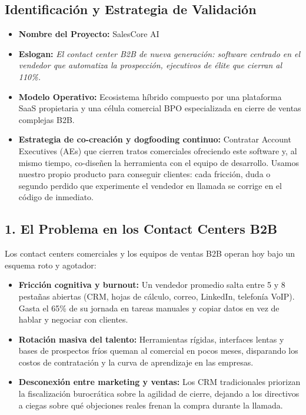 \documentclass[12pt,letterpaper]{article}
\begin{document}
\subsection*{Identificación y Estrategia de Validación}
\begin{itemize}
    \item \textbf{Nombre del Proyecto:} SalesCore AI
    \item \textbf{Eslogan:} \textit{El contact center B2B de nueva generación: software centrado en el vendedor que automatiza la prospección, ejecutivos de élite que cierran al 110\%.}
    \item \textbf{Modelo Operativo:} Ecosistema híbrido compuesto por una plataforma SaaS propietaria y una célula comercial BPO especializada en cierre de ventas complejas B2B.
    \item \textbf{Estrategia de co-creación y dogfooding continuo:} Contratar Account Executives (AEs) que cierren tratos comerciales ofreciendo este software y, al mismo tiempo, co-diseñen la herramienta con el equipo de desarrollo. Usamos nuestro propio producto para conseguir clientes: cada fricción, duda o segundo perdido que experimente el vendedor en llamada se corrige en el código de inmediato.
\end{itemize}

\subsection*{1. El Problema en los Contact Centers B2B}
Los contact centers comerciales y los equipos de ventas B2B operan hoy bajo un esquema roto y agotador:
\begin{itemize}
    \item \textbf{Fricción cognitiva y burnout:} Un vendedor promedio salta entre 5 y 8 pestañas abiertas (CRM, hojas de cálculo, correo, LinkedIn, telefonía VoIP). Gasta el 65\% de su jornada en tareas manuales y copiar datos en vez de hablar y negociar con clientes.
    \item \textbf{Rotación masiva del talento:} Herramientas rígidas, interfaces lentas y bases de prospectos fríos queman al comercial en pocos meses, disparando los costos de contratación y la curva de aprendizaje en las empresas.
    \item \textbf{Desconexión entre marketing y ventas:} Los CRM tradicionales priorizan la fiscalización burocrática sobre la agilidad de cierre, dejando a los directivos a ciegas sobre qué objeciones reales frenan la compra durante la llamada.
\end{itemize}
\end{document}
